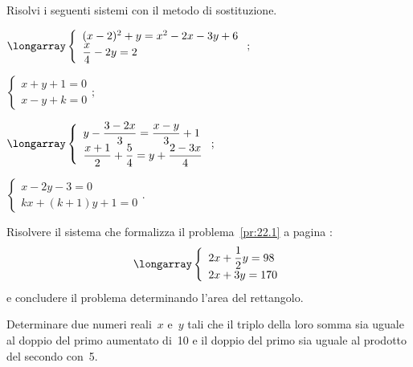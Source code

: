 \begin{esercizio}[\Ast]
 \label{ese:21.13}
Risolvi i seguenti sistemi con il metodo di sostituzione.
 \begin{multicols}{2}
 \begin{enumeratea}
  \item $\longarray\left\{\begin{array}{l}(x-2)^{2}+y=x^{2}-2x-3y+6\\\dfrac{x}{4}-2y=2 \end{array}\right.;$
  \item $\left\{\begin{array}{l}x+y+1=0 \\x-y+k=0 \end{array}\right.;$
\item $\longarray\left\{\begin{array}{l}y-\dfrac{3-2x}{3}=\dfrac{x-y}{3}+1\\\dfrac{x+1}{2}+\dfrac{5}{4}=y+\dfrac{2-3x}{4}\end{array}\right.;$
\item $\left\{\begin{array}{l}x-2y-3=0\\kx+(k+1)y+1=0 \end{array}\right..$
 \end{enumeratea}
 \end{multicols}
\end{esercizio}

\begin{esercizio}
 \label{ese:21.14}
 Risolvere il sistema che formalizza il problema~\ref{pr:22.1} a pagina \pageref{pr:22.1}:
\[\longarray\left\{\begin{array}{l}2x+\dfrac{1}{2}y=98
\\2x+3y=170 \end{array}\right.\]
e concludere il problema determinando l'area del rettangolo.
\end{esercizio}

\begin{esercizio}
 \label{ese:21.15}
Determinare due numeri reali~$x$ e~$y$ tali che il
triplo della loro somma sia uguale al doppio del primo aumentato di~10
e il doppio del primo sia uguale al prodotto del secondo con~5.
 \end{esercizio}

